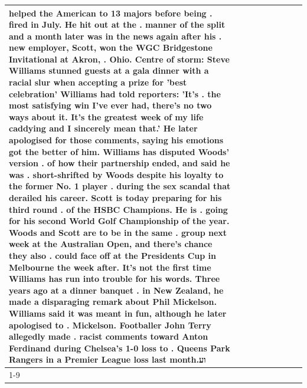 \begin{table}[H]
\begin{tabular}{lllrlllll}
helped the American to 13 majors before being . fired in July. He hit out at the . manner of the split and a month later was in the news again after his . new employer, Scott, won the WGC Bridgestone Invitational at Akron, . Ohio. Centre of storm: Steve Williams stunned guests at a gala dinner with a racial slur when accepting a prize for 'best celebration' Williams had told reporters: 'It's . the most satisfying win I've ever had, there's no two ways about it. It's the greatest week of my life caddying and I sincerely mean that.' He later apologised for those comments, saying his emotions got the better of him. Williams has disputed Woods' version . of how their partnership ended, and said he was . short-shrifted by Woods despite his loyalty to the former No. 1 player . during the sex scandal that derailed his career. Scott is today preparing for his third round . of the HSBC Champions. He is . going for his second World Golf Championship of the year. Woods and Scott are to be in the same . group next week at the Australian Open, and there's chance they also . could face off at the Presidents Cup in Melbourne the week after. It's not the first time Williams has run into trouble for his words. Three years ago at a dinner banquet . in New Zealand, he made a disparaging remark about Phil Mickelson. Williams said it was meant in fun, although he later apologised to . Mickelson. Footballer John Terry allegedly made . racist comments toward Anton Ferdinand during Chelsea's 1-0 loss to . Queens Park Rangers in a Premier League loss last month.וע \\
\cline{1-9}

\end{tabular}
\end{table}

